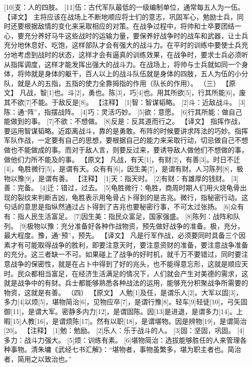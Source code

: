 \documentclass[a4paper,12pt,UTF8,twoside]{ctexbook}
\begin{document}
[10]支：人的四肢。
[11]伍：古代军队最低的一级编制单位，通常每五人为一伍。
【译文】
主将应该在战场上不断地顺应将士们的意志，巩固军心，勉励士兵，同时还要根据敌情的变化来采取相应的对策。在战争过程中，将帅和士卒要团结一心，要充分养好马牛这些战时的运输力量，要保养好战争时的战车和武器，让士兵充分地休息好、吃饱，这样部队才会有强大的战斗力。在平时的训练中要使士兵充分地考虑到战时的状态，这样才会有逼真的训练效果，在战争时，要求士兵必须听从指挥调度，这样才能发挥出强大的战斗力。在战场上，将帅与士兵就如同一个身体，将帅就是身体的躯干，百人以上的战斗队伍就是身体的四肢，五人为伍的小分队，就是人的五指，五指的使力全靠拇指的作用（队长的作用）。
（三）
【原文】
凡战，智[1]也。斗[2]，勇也。陈[3]，巧[4]也。用其所欲[5]，行其所能[6]，废其不欲[7]不能。于敌反是[8]。
【注释】
[1]智：智谋韬略。
[2]斗：近敌战斗。
[3]陈：通“阵”，指摆战阵。
[4]巧：灵活巧妙。
[5]欲：意愿。
[6]行其所能：做自己能做到的事。
[7]不欲：不想做。
[8]反是：反其道而行之。
【译文】
指挥作战，要运用智谋韬略。近距离战斗，靠的是勇敢。布阵的时候要讲求阵法的巧妙。指挥军队作战，一定要有自己的思想，要根据自己的能力来采取行动，切忌做自己不想做也不能做成的事。而对于敌人言，则要反过来，要诱导敌人做他们不想做的事，做他们力所不能及的事。
【原文】
凡战，有天[1]，有财[2]，有善[3]。时日不迁[4]，龟胜微行[5]，是谓有天。众有有[6]，因生美[7]，是谓有财。人习陈列[8]，极物以豫[9]，是谓有善。
【注释】
[1]天：指天时。
[2]有财：有雄厚的钱财。
[3]善：完备。
[4]迁：错过，过去。
[5]龟胜微行：龟胜，商周时期人们用火烧龟骨出现的裂纹来判断吉凶，龟胜表示用龟骨占卜得到的是吉兆。微行，指秘密行动。这句话的意思是指纵然通过占卜得到了吉兆也要秘密行事，不可太过张扬。
[6]众有有：指人民生活富足。
[7]因生美：指民众富足，国家强盛。
[8]陈列：战阵和队列。
[9]极物以豫：充分准备好各种作战物资，预先做好战争的准备。极，充分，最大程度。豫，通“预”，预先。
【译文】
凡是行军作战，必须要同时具备三个因素才有可能取得战争的胜利，即要注意天时，要注意资财的准备，要注意战争准备的充分。这三者缺一不可。如果碰上了战争的好时机，就千万不要错过，同时要注意战争的保密性，就是在占卜中得到了好的兆头，也不能得意忘形，这就是顺应天时。民众都相当富足，在经济生活满足的情况下，人们就会产生对美德的需求，这就是战争中的有财。兵士都能够熟悉各种战法的运用，能够充分积聚战争所需要的物资，这就是有善。
（四）
【原文】
人勉[1]及任，是谓乐人[2]。大军以固[3]，多力[4]以烦[5]，堪物简治[6]，见物应卒[7]，是谓行豫[8]。轻车[9]轻徒[10]，弓矢固御[11]，是谓大军。密静多内力[12]，是谓固陈。因[13]是进退，是谓多力[14]。上暇[15]人教[16]，是谓烦陈[17]。然有以职[18]，是谓堪物。因是辨物[19]，是谓简治[20]。
【注释】
[1]勉：勉励。
[2]乐人：乐于战斗的人。
[3]固：坚固，巩固。
[4]多力：战斗力强大。
[5]烦：训练有素。
[6]堪物简治：选拔能够胜任的人来管理各种事物。清朱墉《武经七书汇解》：“堪物者，事物虽繁多，堪为职主者也。简治者，简用之以致治也。”
\end{document}
